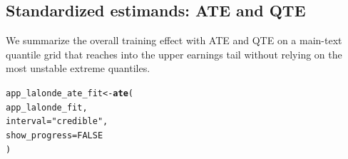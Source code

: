 \documentclass[article]{jss}\usepackage[]{graphicx}\usepackage[]{xcolor}
\makeatletter
\newcommand{\hlnum}[1]{\textcolor[rgb]{0.686,0.059,0.569}{#1}}%
\newcommand{\hlsng}[1]{\textcolor[rgb]{0.192,0.494,0.8}{#1}}%
\newcommand{\hldef}[1]{\textcolor[rgb]{0.345,0.345,0.345}{#1}}%
\newcommand{\hlkwb}[1]{\textcolor[rgb]{0.69,0.353,0.396}{#1}}%
\newcommand{\hlkwc}[1]{\textcolor[rgb]{0.333,0.667,0.333}{#1}}%
\newcommand{\hlkwd}[1]{\textcolor[rgb]{0.737,0.353,0.396}{\textbf{#1}}}%
\newenvironment{kframe}{%
 \def\at@end@of@kframe{}%
 \ifinner\ifhmode%
  \def\at@end@of@kframe{\end{minipage}}%
  \begin{minipage}{\columnwidth}%
 \fi\fi%
 \def\FrameCommand##1{\hskip\@totalleftmargin \hskip-\fboxsep
 \colorbox{shadecolor}{##1}\hskip-\fboxsep
     \hskip-\linewidth \hskip-\@totalleftmargin \hskip\columnwidth}%
 \MakeFramed {\advance\hsize-\width
   \@totalleftmargin\z@ \linewidth\hsize
   \@setminipage}}%
 {\par\unskip\endMakeFramed%
 \at@end@of@kframe}
\newenvironment{knitrout}{}{} %
\makeatother
\begin{document}
\begin{table}[H]
\centering
\caption{\label{tab:app_lalonde_posterior-results}Posterior summaries of arm-specific GPD tail parameters for treated and control earnings models.\label{tab:app_lalonde_tail_params}}
\centering
{}
\end{table}

\begin{table}[H]
\centering
\caption{\label{tab:app_lalonde_posterior-results}Posterior summaries for the arm-specific GPD tail-shape parameter $\xi_a$.\label{tab:app_lalonde_tail_shape}}
\centering
{}
\end{table}



\subsection{Standardized estimands: ATE and QTE}

We summarize the overall training effect with ATE and QTE on a
main-text quantile grid that reaches into the upper earnings tail
without relying on the most unstable extreme quantiles.





\begin{knitrout}\footnotesize
{}\color{fgcolor}\begin{kframe}
\begin{alltt}
\hldef{app_lalonde_ate_fit} \hlkwb{<-} \hlkwd{ate}\hldef{(}
  \hldef{app_lalonde_fit,}
  \hlkwc{interval} \hldef{=} \hlsng{"credible"}\hldef{,}
  \hlkwc{show_progress} \hldef{=} \hlnum{FALSE}
\hldef{)}
\end{alltt}
\end{kframe}
\end{knitrout}
\end{document}
